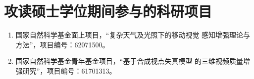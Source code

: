 \chapter{攻读硕士学位期间参与的科研项目}
	\begin{enumerate}
		\item 国家自然科学基金面上项目，“复杂天气及光照下的移动视觉
		感知增强理论与方法”，项目编号：62071500。
		\item 国家自然科学基金青年基金项目，“基于合成视点失真模型
		的三维视频质量增强研究”，项目编号：61701313。
	\end{enumerate}
	